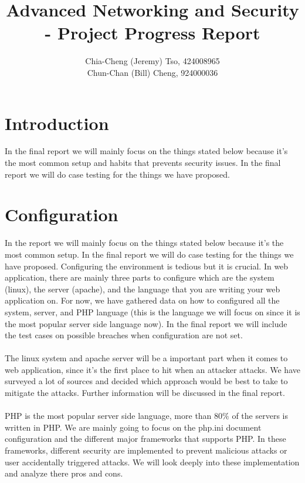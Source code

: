 \documentclass[10pt, a4paper]{article}
\title{
    Advanced Networking and Security\\
    - Project Progress Report 
    \vspace{-2ex}
}
\author{
    \normalfont \normalsize 
    Chia-Cheng (Jeremy) Tso, 
    424008965\\
    \normalfont \normalsize 
    Chun-Chan (Bill) Cheng, 
    924000036
}
\date{
    \normalfont \normalsize 
    \vspace{-5ex}
}
\begin{document}
\maketitle
\section{Introduction}
In the final report we will mainly focus on the things stated below
because it's the most common setup and habits that prevents security issues. 
In the final report we will do case testing for the things we have proposed.
%   
\section{Configuration}
In the report we will mainly focus on the things stated below
because it's the most common setup. In the final report we will do case testing for the things we have proposed.
Configuring the environment is tedious but it is crucial. In web application, there are mainly three parts to configure
which are the system (linux), the server (apache), and the language that you are writing your web application on.
For now, we have gathered data on how to configured all the system, server, and PHP language (this is the language we will
focus on since it is the most popular server side language now). In the final report we will include the test cases on possible breaches when
configuration are not set.
\\\\
The linux system and apache server will be a important part when it comes to web application, since it's the first place to hit when an attacker
attacks. We have surveyed a lot of sources and decided which approach would be best to take to mitigate the attacks. Further information will
be discussed in the final report.
\\\\
PHP is the most popular server side language, more than $80\%$ of the servers is written in PHP\cite{PHPusuage}. We are mainly going to focus
on the php.ini document configuration and the different major frameworks that supports PHP. In these frameworks, different security are implemented
to prevent malicious attacks or user accidentally triggered attacks. We will look deeply into these implementation and analyze there pros and cons.
\end{document}
